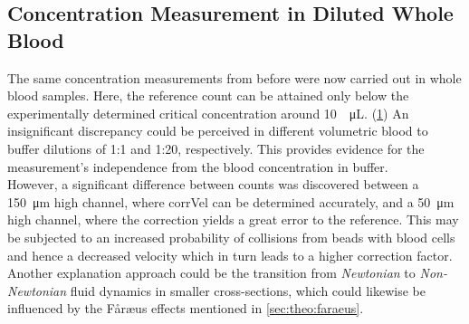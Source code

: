 \subsection{Concentration Measurement in Diluted Whole Blood}
\label{sec:res:wholeBlood}
The same concentration measurements from before were now carried out in whole blood samples. Here, the reference count can be attained only below the experimentally determined critical concentration around \SI{10}{\per\micro\liter}. (\cref{fig:conc:blood}) An insignificant discrepancy could be perceived in different volumetric blood to buffer dilutions of 1:1 and 1:20, respectively. This provides evidence for the measurement's independence from the blood concentration in buffer. \\
However, a significant difference between counts was discovered between a \SI{150}{\micro\meter} high channel, where \gls{corrVel} can be determined accurately, and a \SI{50}{\micro\meter} high channel, where the correction yields a great error to the reference. This may be subjected to an increased probability of collisions from beads with blood cells and hence a decreased velocity which in turn leads to a higher correction factor. Another explanation approach could be the transition from \textit{Newtonian} to \textit{Non-Newtonian} fluid dynamics in smaller cross-sections, which could likewise be influenced by the F\aa{}r\ae{}us effects mentioned in \cref{sec:theo:faraeus}.
\begin{figure}[b!]
	\centering
	 \hfill
	\addtocounter{subfigure}{-1}
	\label{fig:conc:blood}
\end{figure}

